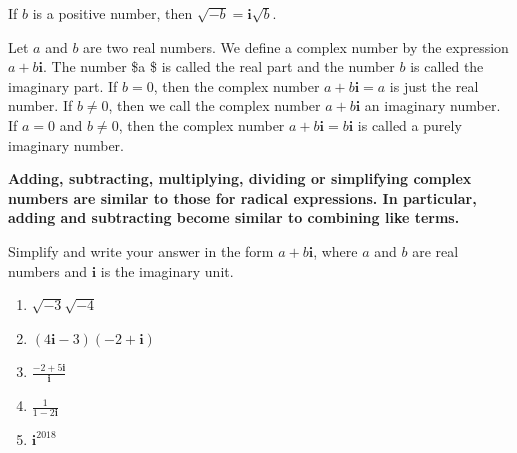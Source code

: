 \documentclass[
  en,11pt]{elegantbook}
\providecommand{\tightlist}{%
  \setlength{\itemsep}{0pt}\setlength{\parskip}{0pt}}
\newcommand{\ii}{\mathbf{i}}
\renewenvironment{example}[1][]{
  \refstepcounter{exam}
  \par\noindent\textbf{\color{main}{\examplename} \theexam #1}
  \rmfamily
}{
  \par\ignorespacesafterend
}
\begin{document}
If \(b\) is a positive number, then \(\sqrt{-b}=\ii\sqrt{b}\).

Let \(a\) and \(b\) are two real numbers. We define a complex number by the expression \(a+b \ii\).
The number \$a \$ is called the real part and the number \(b\) is called the imaginary part. If \(b=0\),
then the complex number \(a+b\ii=a\) is just the real number.
If \(b\neq 0\), then we call the complex number \(a+b\ii\) an imaginary number.
If \(a=0\) and \(b\neq 0\), then the complex number \(a+b\ii=b\ii\) is called a purely imaginary number.

\textbf{Adding, subtracting, multiplying, dividing or simplifying complex numbers are similar to those for radical expressions. In particular, adding and subtracting become similar to combining like terms.}

\begin{example}

Simplify and write your answer in the form \(a+b\ii\), where \(a\) and \(b\) are real numbers and \(\ii\) is the imaginary unit.

\begin{enumerate}
\def\labelenumi{\arabic{enumi}.}
\tightlist
\item
  \(\sqrt{-3}\sqrt{-4}\)
\item
  \((4\ii-3)(-2+\ii)\)
\item
  \(\frac{-2+5\ii}{\ii}\)
\item
  \(\frac{1}{1-2\ii}\)
\item
  \(\ii^{2018}\)
\end{enumerate}

\end{example}
\end{document}
